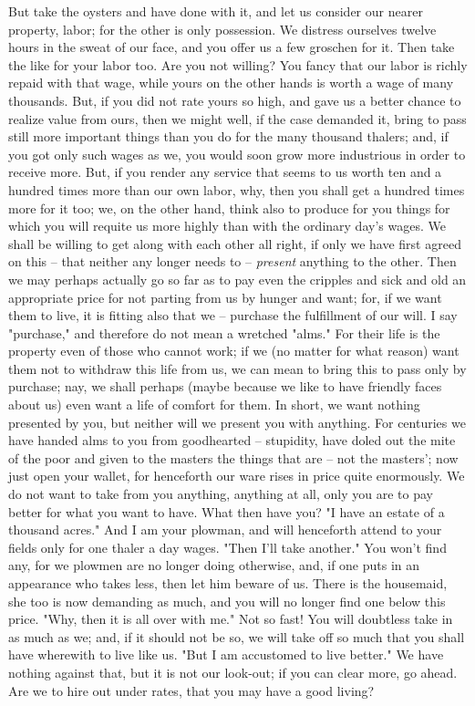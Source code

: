 \documentclass[a4paper]{book}
\begin{document}
But take the oysters and have done with it, and let us consider our nearer 
property, labor; for the other is only possession. We distress ourselves 
twelve hours in the sweat of our face, and you offer us a few groschen for it. 
Then take the like for your labor too. Are you not willing? You fancy that our 
labor is richly repaid with that wage, while yours on the other hands is worth 
a wage of many thousands. But, if you did not rate yours so high, and gave us 
a better chance to realize value from ours, then we might well, if the case 
demanded it, bring to pass still more important things than you do for the 
many thousand thalers; and, if you got only such wages as we, you would soon 
grow more industrious in order to receive more. But, if you render any service 
that seems to us worth ten and a hundred times more than our own labor, why, 
then you shall get a hundred times more for it too; we, on the other hand, 
think also to produce for you things for which you will requite us more highly 
than with the ordinary day's wages. We shall be willing to get along with each 
other all right, if only we have first agreed on this -- that neither any 
longer needs to -- \textit{present} anything to the other. Then we may perhaps 
actually go so far as to pay even the cripples and sick and old an appropriate 
price for not parting from us by hunger and want; for, if we want them to 
live, it is fitting also that we -- purchase the fulfillment of our will. I 
say "{}purchase,"{} and therefore do not mean a wretched "{}alms."{} For their 
life is the property even of those who cannot work; if we (no matter for what 
reason) want them not to withdraw this life from us, we can mean to bring this 
to pass only by purchase; nay, we shall perhaps (maybe because we like to have 
friendly faces about us) even want a life of comfort for them. In short, we 
want nothing presented by you, but neither will we present you with anything. 
For centuries we have handed alms to you from goodhearted -- stupidity, have 
doled out the mite of the poor and given to the masters the things that are -- 
not the masters'; now just open your wallet, for henceforth our ware rises in 
price quite enormously. We do not want to take from you anything, anything at 
all, only you are to pay better for what you want to have. What then have you? 
"{}I have an estate of a thousand acres."{} And I am your plowman, and will 
henceforth attend to your fields only for one thaler a day wages. "{}Then I'll 
take another."{} You won't find any, for we plowmen are no longer doing 
otherwise, and, if one puts in an appearance who takes less, then let him 
beware of us. There is the housemaid, she too is now demanding as much, and 
you will no longer find one below this price. "{}Why, then it is all over with 
me."{} Not so fast! You will doubtless take in as much as we; and, if it 
should not be so, we will take off so much that you shall have wherewith to 
live like us. "{}But I am accustomed to live better."{} We have nothing 
against that, but it is not our look-out; if you can clear more, go ahead. Are 
we to hire out under rates, that you may have a good living?
\end{document}
